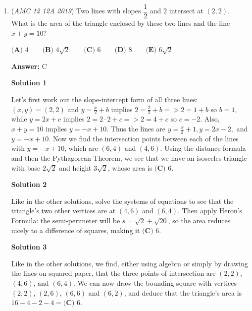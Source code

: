 \begin{enumerate}
\textbf{Solution 3}

If we want the answer to have as many terms as possible, we need to make as many terms cancel out as much as we can. Because $45 - 1 <$ $\frac12$60 so we can eliminate $E$. Now lets make every integer cancel to zero except for $45$ and then we account for $0$ and $45$ to get $44*2+1+1=\boxed{\textbf{(D) }90}$. Pls help me clarify idk how to explain it clearer.

 


	\item (\textit{AMC 12 12A 2019}) Two lines with slopes $\dfrac{1}{2}$ and $2$ intersect at $(2,2)$. What is the area of the triangle enclosed by these two lines and the line $x+y=10$?


 $\textbf{(A) } 4 \qquad\textbf{(B) } 4\sqrt{2} \qquad\textbf{(C) } 6 \qquad\textbf{(D) } 8 \qquad\textbf{(E) } 6\sqrt{2}$

 \textbf{Answer: }C



\textbf{Solution 1}

Let's first work out the slope-intercept form of all three lines:$(x,y)=(2,2)$ and $y=\frac{x}{2} + b$ implies $2=\frac{2}{2} +b=> 2=1+b$ so $b=1$, while $y=2x + c$ implies $2= 2 \cdot 2+c=> 2=4+c$ so $c=-2$. Also, $x+y=10$ implies $y=-x+10$. Thus the lines are $y=\frac{x}{2} +1, y=2x-2,$ and $y=-x+10$. Now we find the intersection points between each of the lines with $y=-x+10$, which are $(6,4)$ and $(4,6)$. Using the distance formula and then the Pythagorean Theorem, we see that we have an isosceles triangle with base $2\sqrt{2}$ and height $3\sqrt{2}$, whose area is $\boxed{\textbf{(C) }6}$.

 



\textbf{Solution 2}

Like in the other solutions, solve the systems of equations to see that the triangle's two other vertices are at $(4, 6)$ and $(6, 4)$. Then apply Heron's Formula: the semi-perimeter will be $s = \sqrt{2} + \sqrt{20}$, so the area reduces nicely to a difference of squares, making it $\boxed{\textbf{(C) }6}$.

 



\textbf{Solution 3}

Like in the other solutions, we find, either using algebra or simply by drawing the lines on squared paper, that the three points of intersection are $(2, 2)$, $(4, 6)$, and $(6, 4)$. We can now draw the bounding square with vertices $(2, 2)$, $(2, 6)$, $(6, 6)$ and $(6, 2)$, and deduce that the triangle's area is $16-4-2-4=\boxed{\textbf{(C) }6}$.


\end{enumerate}
